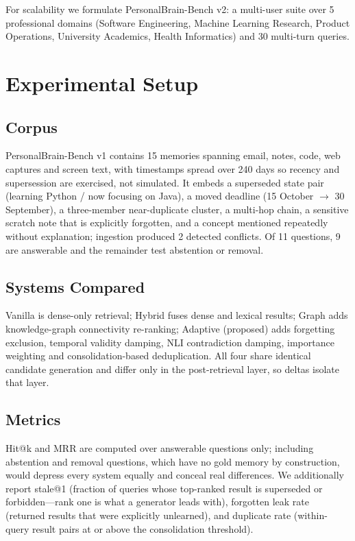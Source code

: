 \documentclass[conference]{IEEEtran}
\begin{document}
For scalability we formulate PersonalBrain-Bench v2: a multi-user suite over 5 professional domains (Software Engineering, Machine Learning Research, Product Operations, University Academics, Health Informatics) and 30 multi-turn queries.

\section{Experimental Setup}

\subsection{Corpus}
PersonalBrain-Bench v1 contains 15 memories spanning email, notes, code, web captures and screen text, with timestamps spread over 240 days so recency and supersession are exercised, not simulated. It embeds a superseded state pair (learning Python / now focusing on Java), a moved deadline (15 October $\to$ 30 September), a three-member near-duplicate cluster, a multi-hop chain, a sensitive scratch note that is explicitly forgotten, and a concept mentioned repeatedly without explanation; ingestion produced 2 detected conflicts. Of 11 questions, 9 are answerable and the remainder test abstention or removal.

\subsection{Systems Compared}
Vanilla is dense-only retrieval; Hybrid fuses dense and lexical results; Graph adds knowledge-graph connectivity re-ranking; Adaptive (proposed) adds forgetting exclusion, temporal validity damping, NLI contradiction damping, importance weighting and consolidation-based deduplication. All four share identical candidate generation and differ only in the post-retrieval layer, so deltas isolate that layer.

\subsection{Metrics}
Hit@k and MRR are computed over answerable questions only; including abstention and removal questions, which have no gold memory by construction, would depress every system equally and conceal real differences. We additionally report stale@1 (fraction of queries whose top-ranked result is superseded or forbidden---rank one is what a generator leads with), forgotten leak rate (returned results that were explicitly unlearned), and duplicate rate (within-query result pairs at or above the consolidation threshold).
\end{document}

